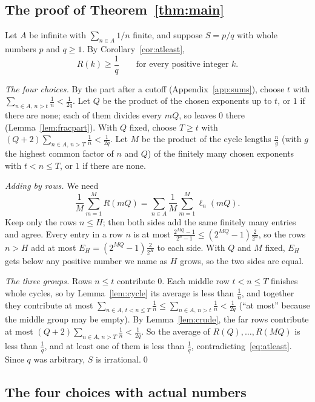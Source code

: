 \documentclass[10pt]{article}
\theoremstyle{plain}
\theoremstyle{definition}
\theoremstyle{remark}
\newcommand{\lft}{\ell}
\begin{document}
\subsection{The proof of Theorem~\ref{thm:main}}\label{app:proof}

Let $A$ be infinite with $\sum_{n\in A}1/n$ finite, and suppose $S=p/q$ with
whole numbers $p$ and $q\ge1$. By Corollary~\ref{cor:atleast},
\begin{equation}\label{eq:atleast}
 R(k)\ge\frac1q\qquad\text{for every positive integer }k .
\end{equation}

\emph{The four choices.} By the part after a cutoff (Appendix~\ref{app:sums}),
choose $t$ with $\sum_{n\in A,\,n>t}\tfrac1n<\tfrac1{2q}$. Let $Q$ be the
product of the chosen exponents up to $t$, or $1$ if there are none; each of
them divides every $mQ$, so leaves $0$ there (Lemma~\ref{lem:fracpart}). With
$Q$ fixed, choose $T\ge t$ with $(Q+2)\sum_{n\in A,\,n>T}\tfrac1n<\tfrac1{2q}$.
Let $M$ be the product of the cycle lengths $\tfrac n{g}$ (with $g$ the highest
common factor of $n$ and $Q$) of the finitely many chosen exponents with
$t<n\le T$, or $1$ if there are none.

\emph{Adding by rows.} We need
\[
 \frac1M\sum_{m=1}^{M}R(mQ)=\sum_{n\in A}\frac1M\sum_{m=1}^{M}\lft_n(mQ).
\]
Keep only the rows $n\le H$; then both sides add the same finitely many
entries and agree. Every entry in a row $n$ is at most
$\tfrac{2^{MQ}-1}{2^n-1}\le(2^{MQ}-1)\tfrac2{2^n}$, so the rows $n>H$ add at
most $E_H=(2^{MQ}-1)\tfrac2{2^H}$ to each side. With $Q$ and $M$ fixed, $E_H$
gets below any positive number we name as $H$ grows, so the two sides are
equal.

\emph{The three groups.} Rows $n\le t$ contribute $0$. Each middle row
$t<n\le T$ finishes whole cycles, so by Lemma~\ref{lem:cycle} its average is
less than $\tfrac1n$, and together they contribute at most
$\sum_{n\in A,\,t<n\le T}\tfrac1n\le\sum_{n\in A,\,n>t}\tfrac1n<\tfrac1{2q}$
(``at most'' because the middle group may be empty). By
Lemma~\ref{lem:crude}, the far rows contribute at most
$(Q+2)\sum_{n\in A,\,n>T}\tfrac1n<\tfrac1{2q}$. So the average of
$R(Q),\dots,R(MQ)$ is less than $\tfrac1q$, and at least one of them is less
than $\tfrac1q$, contradicting~\eqref{eq:atleast}. Since $q$ was arbitrary,
$S$ is irrational.\qed

\subsection{The four choices with actual numbers}\label{app:numbers}
\end{document}
